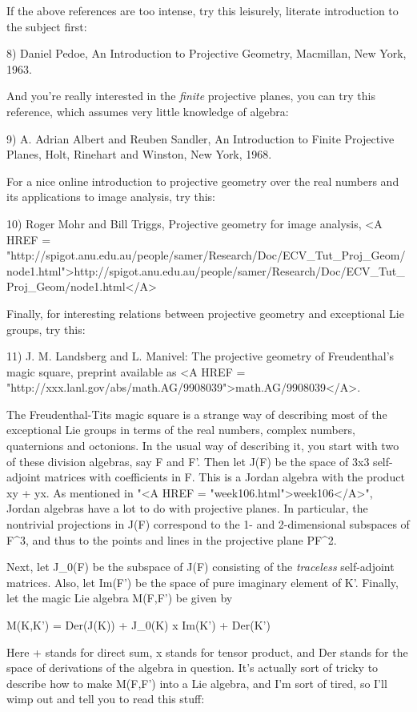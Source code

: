 If the above references are too intense, try this leisurely, literate
introduction to the subject first:

8) Daniel Pedoe, An Introduction to Projective Geometry, Macmillan,
New York, 1963.

And you're really interested in the \emph{finite} projective planes, you
can try this reference, which assumes very little knowledge of algebra:

9) A. Adrian Albert and Reuben Sandler, An Introduction to Finite
Projective Planes, Holt, Rinehart and Winston, New York, 1968.

For a nice online introduction to projective geometry over the real
numbers and its applications to image analysis, try this:

10) Roger Mohr and Bill Triggs, Projective geometry for image analysis,
<A HREF = "http://spigot.anu.edu.au/people/samer/Research/Doc/ECV_Tut_Proj_Geom/node1.html">http://spigot.anu.edu.au/people/samer/Research/Doc/ECV_Tut_Proj_Geom/node1.html</A>

Finally, for interesting relations between projective geometry
and exceptional Lie groups, try this:

11) J. M. Landsberg and L. Manivel: The projective geometry of
Freudenthal's magic square, preprint available as 
<A HREF = "http://xxx.lanl.gov/abs/math.AG/9908039">math.AG/9908039</A>.

The Freudenthal-Tits magic square is a strange way of describing
most of the exceptional Lie groups in terms of the real numbers,
complex numbers, quaternions and octonions.  In the usual way of 
describing it, you start with two of these division algebras, say
F and F'.  Then let J(F) be the space of 3x3 self-adjoint matrices 
with coefficients in F.  This is a Jordan algebra with the product
xy + yx.  As mentioned in "<A HREF = "week106.html">week106</A>", Jordan algebras have a lot to
do with projective planes.  In particular, the nontrivial projections 
in J(F) correspond to the 1- and 2-dimensional subspaces of F^{3},
and thus to the points and lines in the projective plane PF^{2}.   

Next, let J_0(F) be the subspace of J(F) consisting of the \emph{traceless} 
self-adjoint matrices.  Also, let Im(F') be the space of pure imaginary 
element of K'.  Finally, let the magic Lie algebra M(F,F') be given by

M(K,K') = Der(J(K)) + J_0(K) x Im(K') + Der(K')

Here + stands for direct sum, x stands for tensor product, and Der 
stands for the space of derivations of the algebra in question.  
It's actually sort of tricky to describe how to make M(F,F') into
a Lie algebra, and I'm sort of tired, so I'll wimp out and tell
you to read this stuff:

